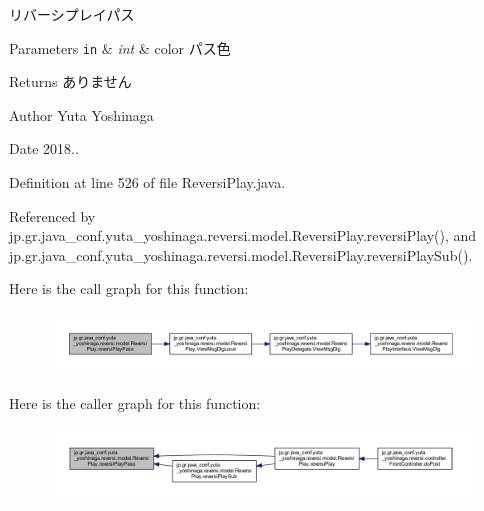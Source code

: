 リバーシプレイパス 


\begin{DoxyParams}[1]{Parameters}
\mbox{\tt in}  & {\em int} & color パス色 \\
\hline
\end{DoxyParams}
\begin{DoxyReturn}{Returns}
ありません 
\end{DoxyReturn}
\begin{DoxyAuthor}{Author}
Yuta Yoshinaga 
\end{DoxyAuthor}
\begin{DoxyDate}{Date}
2018.. 
\end{DoxyDate}


Definition at line 526 of file Reversi\+Play.\+java.



Referenced by jp.\+gr.\+java\+\_\+conf.\+yuta\+\_\+yoshinaga.\+reversi.\+model.\+Reversi\+Play.\+reversi\+Play(), and jp.\+gr.\+java\+\_\+conf.\+yuta\+\_\+yoshinaga.\+reversi.\+model.\+Reversi\+Play.\+reversi\+Play\+Sub().

Here is the call graph for this function\+:
\nopagebreak
\begin{figure}[H]
\begin{center}
\leavevmode
\includegraphics[width=350pt]{classjp_1_1gr_1_1java__conf_1_1yuta__yoshinaga_1_1reversi_1_1model_1_1_reversi_play_acf3c99fcbff26d65f7b12f99d69ab88d_cgraph}
\end{center}
\end{figure}
Here is the caller graph for this function\+:
\nopagebreak
\begin{figure}[H]
\begin{center}
\leavevmode
\includegraphics[width=350pt]{classjp_1_1gr_1_1java__conf_1_1yuta__yoshinaga_1_1reversi_1_1model_1_1_reversi_play_acf3c99fcbff26d65f7b12f99d69ab88d_icgraph}
\end{center}
\end{figure}
\mbox{\label{classjp_1_1gr_1_1java__conf_1_1yuta__yoshinaga_1_1reversi_1_1model_1_1_reversi_play_a6ea2a343ad2fb3ef1317570e87c3fc4f}} 
